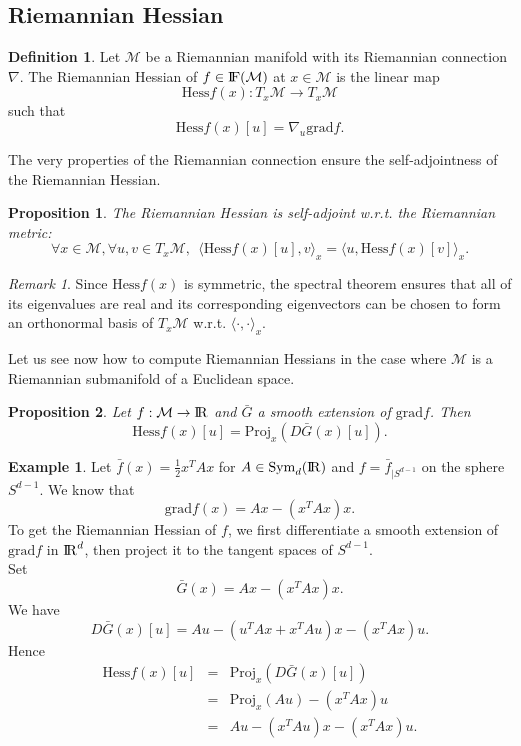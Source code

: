 \documentclass[10pt,a4paper]{book}
\theoremstyle{definition}
\newtheorem{defn}{Definition}[section]
\newtheorem{exm}{Example}[section]
\theoremstyle{plain}
\newtheorem{prop}{Proposition}[section]
\theoremstyle{remark}
\newtheorem{rmk}{Remark}[section]
\newcommand{\grad}{\textrm{grad}}
\newcommand \M {\mathcal{M}}
\newcommand \Hess {\text{Hess}}
\def\R{{\rm I\kern-0.16em R}}
\def\F{{\rm I\kern-0.16em F}}
\begin{document}
\subsection{Riemannian Hessian}
\begin{defn}
Let $\M$ be a Riemannian manifold with its Riemannian connection $\nabla$. The Riemannian Hessian of $f\in \F(\M)$ at $x\in \M$ is the linear map
$$\Hess f(x):T_x\M \to T_x\M$$ such that
$$\Hess f(x)[u]=\nabla_u \grad f.$$
\end{defn}
The very properties of the Riemannian connection ensure the self-adjointness of the Riemannian Hessian.
\begin{prop}
The Riemannian Hessian is self-adjoint w.r.t. the Riemannian metric:
$$\forall x\in \M, \forall u,v\in T_x\M,~~\langle \Hess f(x)[u],v\rangle_x=\langle u,\Hess f(x)[v]\rangle_x.$$
\end{prop}
\begin{rmk}
Since $\Hess f(x)$ is symmetric, the spectral theorem ensures that all of its eigenvalues are real and its corresponding eigenvectors can be chosen to form an orthonormal basis of $T_x\M$ w.r.t. $\langle \cdot,\cdot\rangle_x$. 
\end{rmk}
Let us see now how to compute Riemannian Hessians in the case where $\M$ is a Riemannian submanifold of a Euclidean space. 
\begin{prop}
Let $f:\M \to \R$ and $\bar{G}$ a smooth extension of $\grad f$. Then
$$\Hess f(x)[u]=\text{Proj}_x(D\bar{G}(x)[u]).$$
\end{prop}
\begin{exm}
Let $\bar{f}(x)=\frac{1}{2}x^{T}Ax$ for $A \in \text{Sym}_d(\R)$ and $f=\bar{f}_{\mid S^{d-1}}$ on the sphere $S^{d-1}$. We know that
$$\grad f(x)=Ax-(x^{T}Ax)x.$$
To get the Riemannian Hessian of $f$, we first differentiate a smooth extension of $\grad f$ in $\R^d$, then project it to the tangent spaces of $S^{d-1}$.\\ Set
$$\bar{G}(x)=Ax-(x^{T}Ax)x.$$
We have
$$D\bar{G}(x)[u]=Au-(u^{T}Ax+x^{T}Au)x-(x^{T}Ax)u.$$
Hence
\begin{eqnarray*}
\Hess f(x)[u]&=&\text{Proj}_x(D\bar{G}(x)[u])\\
&=&\text{Proj}_x(Au)-(x^{T}Ax)u\\
&=&Au-(x^TAu)x-(x^{T}Ax)u.
\end{eqnarray*}
\end{exm}
\end{document}
